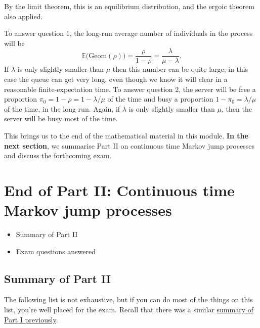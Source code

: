 \documentclass[
  a4paper,
]{article}
\providecommand{\tightlist}{%
  \setlength{\itemsep}{0pt}\setlength{\parskip}{0pt}}
\theoremstyle{definition}
\theoremstyle{definition}
\theoremstyle{definition}
\theoremstyle{remark}
\begin{document}
By the limit theorem, this is an equilibrium distribution, and the ergoic theorem also applied.

To answer question 1, the long-run average number of individuals in the process will be
\[ \mathbb E\big(\text{Geom}(\rho)\big) = \frac{\rho}{1-\rho} = \frac{\lambda}{\mu - \lambda} . \]
If \(\lambda\) is only slightly smaller than \(\mu\) then this number can be quite large; in this case the queue can get very long, even though we know it will clear in a reasonable finite-expectation time.
To answer question 2, the server will be free a proportion \(\pi_0 = 1 - \rho = 1 - \lambda/\mu\) of the time and busy a proportion \(1 - \pi_0 = \lambda/\mu\) of the time, in the long run. Again, if \(\lambda\) is only slightly smaller than \(\mu\), then the server will be busy most of the time.

This brings us to the end of the mathematical material in this module. \textbf{In the next section}, we summarise Part II on continuous time Markov jump processes and discuss the forthcoming exam.

\hypertarget{S22-end}{%
\section{End of Part II: Continuous time Markov jump processes}\label{S22-end}}

\begin{itemize}
\tightlist
\item
  Summary of Part II
\item
  Exam questions answered
\end{itemize}

\hypertarget{summary-ii}{%
\subsection{Summary of Part II}\label{summary-ii}}

The following list is not exhaustive, but if you can do most of the things on this list, you're well placed for the exam. Recall that there was a similar \protect\hyperlink{summary-i}{summary of Part I previously}.
\end{document}
